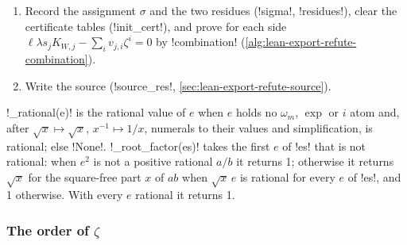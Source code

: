 {{{\begin{algorithm}
\begin{enumerate}
$\hat f_j = \sum_i v_{j,i} w^i \bmod p$ and search a boundary assignment
(\lexpy!find_sigma!, \cref{alg:lean-export-refute-sigma}); stop at the first success. No success
raises \lexcode!the networks agree mod p at every assignment checked!.
\item Record the assignment $\sigma$ and the two residues (\lexpy!sigma!, \lexpy!residues!), clear
the certificate tables (\lexpy!init_cert!), and prove for each side
$\ell\lambda s_jK_{W,j} - \sum_i v_{j,i}\zeta^i = 0$ by \lexpy!combination!
(\cref{alg:lean-export-refute-combination}).
\item Write the source (\lexpy!source_res!, \cref{sec:lean-export-refute-source}).
\end{enumerate}
\end{algorithm}

\begin{definition}\label{def:lean-export-refute-root}
\lexpy!_rational(e)! is the rational value of $e$ when $e$ holds no $\omega_m$, $\exp$ or $i$ atom
and, after $\sqrt x \mapsto \sqrt x$, $x^{-1} \mapsto 1/x$, numerals to their values and
simplification, is rational; else \lexpy!None!. \lexpy!_root_factor(es)! takes the first $e$ of
\lexcode!es! that is not rational: when $e^2$ is not a positive rational $a/b$ it returns 1;
otherwise it returns $\sqrt x$ for the square-free part $x$ of $ab$ when $\sqrt x\, e$ is
rational for every $e$ of \lexcode!es!, and 1 otherwise. With every $e$ rational it returns 1.
\end{definition}

\subsubsection{The order of \texorpdfstring{$\zeta$}{zeta}}

}}}
